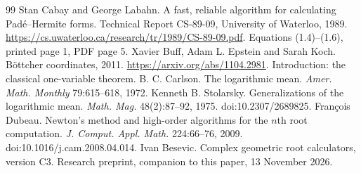 \begin{thebibliography}{99}
 Stan Cabay and George Labahn. A fast, reliable algorithm for calculating
Pad\'e--Hermite forms. Technical Report CS-89-09, University of Waterloo, 1989.
\url{https://cs.uwaterloo.ca/research/tr/1989/CS-89-09.pdf}. Equations (1.4)--(1.6), printed page 1,
PDF page 5.
 Xavier Buff, Adam L. Epstein and Sarah Koch. B\"ottcher coordinates, 2011.
\url{https://arxiv.org/abs/1104.2981}. Introduction: the classical one-variable theorem.
 B. C. Carlson. The logarithmic mean. \emph{Amer. Math. Monthly} 79:615--618, 1972.
 Kenneth B. Stolarsky. Generalizations of the logarithmic mean. \emph{Math. Mag.}
48(2):87--92, 1975. doi:10.2307/2689825.
 Fran\c{c}ois Dubeau. Newton's method and high-order algorithms for the $n$th root
computation. \emph{J. Comput. Appl. Math.} 224:66--76, 2009. doi:10.1016/j.cam.2008.04.014.
 Ivan Besevic. Complex geometric root calculators, version C3. Research preprint,
companion to this paper, 13 November 2026.
\end{thebibliography}
